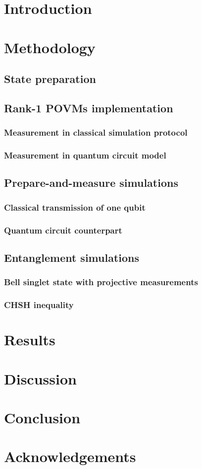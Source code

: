 \documentclass{article}
\begin{document}

\newpage

\newpage
\tableofcontents

\newpage
\section{Introduction}


\newpage
\section{Methodology}
\subsection{State preparation}

\subsection{Rank-1 POVMs implementation}
\subsubsection{Measurement in classical simulation protocol}
\subsubsection{Measurement in quantum circuit model}
\subsection{Prepare-and-measure simulations}
\subsubsection{Classical transmission of one qubit}
\subsubsection{Quantum circuit counterpart}

\subsection{Entanglement simulations}
\subsubsection{Bell singlet state with projective measurements}
\subsubsection{CHSH inequality}

\newpage
\section{Results}

\newpage
\section{Discussion}
\section{Conclusion}
\section{Acknowledgements}

\newpage
\printbibliography
\end{document}

